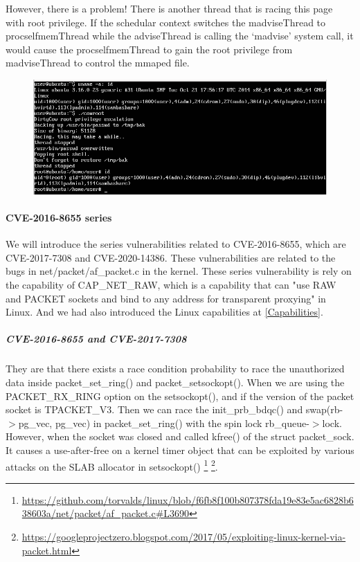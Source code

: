 However, there is a problem! There is another thread that is racing this page with root
privilege. If the schedular context switches the madviseThread to procselfmemThread while
the adviseThread is calling the `madvise' system call, it would cause the
procselfmemThread to gain the root privilege from madviseThread to control the mmaped file.

\begin{figure}
\includegraphics[width=.45\textwidth]{src/Screenshot_2021-12-26_05-14-58.png}
\label{qemumachine}
\end{figure}

\paragraph{CVE-2016-8655 series}
We will introduce the series vulnerabilities related to CVE-2016-8655,
which are
CVE-2017-7308%
and CVE-2020-14386.%
These vulnerabilities are related to the bugs in net/packet/af\_packet.c in the kernel.
These series vulnerability is rely on the capability of CAP\_NET\_RAW,%
which is a capability that can "use RAW and PACKET sockets and bind to
any address for transparent proxying" in Linux. And we had also introduced the Linux
capabilities at \ref{Capabilities}.

\subparagraph{CVE-2016-8655 and CVE-2017-7308} They are that there exists a race condition probability to
race the unauthorized data inside packet\_set\_ring() and packet\_setsockopt().
When we are using the PACKET\_RX\_RING option on the setsockopt(), and if the
version of the packet socket is TPACKET\_V3. Then we can race the init\_prb\_bdqc()
and swap(rb-$>$pg\_vec, pg\_vec) in packet\_set\_ring() with the spin lock rb\_queue-$>$lock.
However, when the socket was closed and called kfree() of the struct packet\_sock.
It causes a use-after-free on a kernel timer object that can be exploited
by various attacks on the SLAB allocator in setsockopt()
\footnote{\url{https://github.com/torvalds/linux/blob/f6fb8f100b807378fda19e83e5ac6828b638603a/net/packet/af\_packet.c\#L3690}}
\footnote{\url{https://googleprojectzero.blogspot.com/2017/05/exploiting-linux-kernel-via-packet.html}}.

